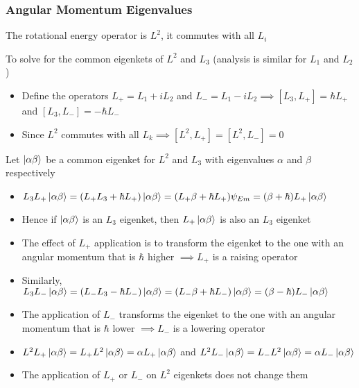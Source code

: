 \documentclass[8pt,t,mathserif,aspectratio=169]{beamer}
\begin{document}
\begin{frame}
  \frametitle{Angular Momentum Eigenvalues}
  \vspace{1mm}
  The rotational energy operator is $L^2$, it commutes with all $L_i$

  To solve for the common eigenkets of $L^2$ and $L_3$ (analysis is similar for $L_1$ and $L_2$)
  \begin{itemize}
    \item Define the operators $L_{+} = L_1 + i L_2$ and $L_{-} = L_1 - i L_2 \implies [L_3,L_{+}] = \hbar L_{+}$ and $[L_3,L_{-}] = -\hbar L_{-}$
    \item Since $L^2$ commutes with all $L_k \implies [L^2,L_{+}] = [L^2,L_{-}] = 0$
  \end{itemize}
  Let $\ket{\alpha \beta}$ be a common eigenket for $L^2$ and $L_3$ with eigenvalues $\alpha$ and $\beta$ respectively 
  \begin{itemize}
    \item $L_3 L_{+} \ket{\alpha \beta} = (L_{+} L_3 + \hbar L_{+}) \ket{\alpha \beta} = (L_{+} \beta + \hbar L_{+}) \psi_{Em} = (\beta + \hbar) L_{+} \ket{\alpha \beta}$
    \item Hence if $\ket{\alpha \beta}$ is an $L_3$ eigenket, then $L_{+} \ket{\alpha \beta}$ is also an $L_3$ eigenket
    \item The effect of $L_{+}$ application is to transform the eigenket to the one with an angular momentum that is $\hbar$ higher $\implies L_{+}$ is a raising operator
    \item Similarly, $L_3 L_{-} \ket{\alpha \beta} = (L_{-} L_3 - \hbar L_{-}) \ket{\alpha \beta} = (L_{-} \beta + \hbar L_{-}) \ket{\alpha \beta} = (\beta - \hbar) L_{-} \ket{\alpha \beta}$
    \item The application of $L_{-}$ transforms the eigenket to the one with an angular momentum that is $\hbar$ lower $\implies L_{-}$ is a lowering operator
    \item $L^2 L_{+} \ket{\alpha \beta} = L_{+} L^2 \ket{\alpha \beta} = \alpha L_{+} \ket{\alpha \beta}$ and $L^2 L_{-} \ket{\alpha \beta} = L_{-} L^2 \ket{\alpha \beta} = \alpha L_{-} \ket{\alpha \beta}$
    \item The application of $L_{+}$ or $L_{-}$ on $L^2$ eigenkets does not change them
  \end{itemize}
\end{frame}

\end{document}
